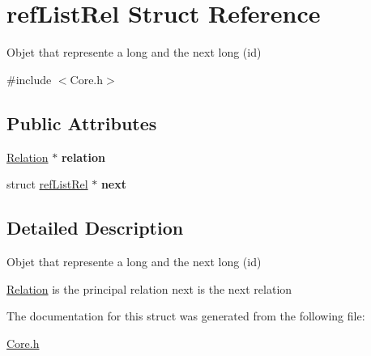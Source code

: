 \hypertarget{structrefListRel}{\section{ref\-List\-Rel Struct Reference}
\label{structrefListRel}
}


Objet that represente a long and the next long (id)  




{\ttfamily \#include $<$Core.\-h$>$}

\subsection*{Public Attributes}
\begin{DoxyCompactItemize}
\item 
\hypertarget{structrefListRel_a9598a4aceb866d060f6b4425e2d926d3}{\hyperlink{structRelation}{Relation} $\ast$ {\bfseries relation}}\label{structrefListRel_a9598a4aceb866d060f6b4425e2d926d3}

\item 
\hypertarget{structrefListRel_aa108a14d477cc8fc9706a7b535879cf8}{struct \hyperlink{structrefListRel}{ref\-List\-Rel} $\ast$ {\bfseries next}}\label{structrefListRel_aa108a14d477cc8fc9706a7b535879cf8}

\end{DoxyCompactItemize}


\subsection{Detailed Description}
Objet that represente a long and the next long (id) 

\hyperlink{structRelation}{Relation} is the principal relation next is the next relation 

The documentation for this struct was generated from the following file\-:\begin{DoxyCompactItemize}
\item 
\hyperlink{Core_8h}{Core.\-h}\end{DoxyCompactItemize}
